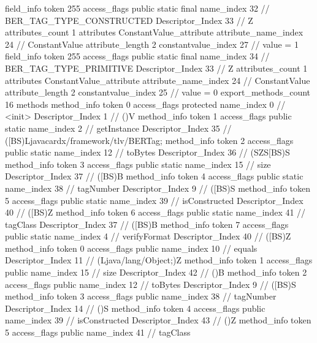 {{{{{{{				}
				}
			}
			field_info {
				token	255
				access_flags	public static final
				name_index	32		// BER_TAG_TYPE_CONSTRUCTED
				Descriptor_Index	33		// Z
				attributes_count	1
				attributes {
				ConstantValue_attribute {
					attribute_name_index	24		// ConstantValue
					attribute_length	2
					constantvalue_index	27		// value = 1
				}
				}
			}
			field_info {
				token	255
				access_flags	public static final
				name_index	34		// BER_TAG_TYPE_PRIMITIVE
				Descriptor_Index	33		// Z
				attributes_count	1
				attributes {
				ConstantValue_attribute {
					attribute_name_index	24		// ConstantValue
					attribute_length	2
					constantvalue_index	25		// value = 0
				}
				}
			}
			}
			export_methods_count	16
			methods {
				method_info {
					token	0
					access_flags	protected
					name_index	0		// <init>
					Descriptor_Index	1		// ()V
				}
				method_info {
					token	1
					access_flags	public static
					name_index	2		// getInstance
					Descriptor_Index	35		// ([BS)Ljavacardx/framework/tlv/BERTag;
				}
				method_info {
					token	2
					access_flags	public static
					name_index	12		// toBytes
					Descriptor_Index	36		// (SZS[BS)S
				}
				method_info {
					token	3
					access_flags	public static
					name_index	15		// size
					Descriptor_Index	37		// ([BS)B
				}
				method_info {
					token	4
					access_flags	public static
					name_index	38		// tagNumber
					Descriptor_Index	9		// ([BS)S
				}
				method_info {
					token	5
					access_flags	public static
					name_index	39		// isConstructed
					Descriptor_Index	40		// ([BS)Z
				}
				method_info {
					token	6
					access_flags	public static
					name_index	41		// tagClass
					Descriptor_Index	37		// ([BS)B
				}
				method_info {
					token	7
					access_flags	public static
					name_index	4		// verifyFormat
					Descriptor_Index	40		// ([BS)Z
				}
				method_info {
					token	0
					access_flags	public
					name_index	10		// equals
					Descriptor_Index	11		// (Ljava/lang/Object;)Z
				}
				method_info {
					token	1
					access_flags	public
					name_index	15		// size
					Descriptor_Index	42		// ()B
				}
				method_info {
					token	2
					access_flags	public
					name_index	12		// toBytes
					Descriptor_Index	9		// ([BS)S
				}
				method_info {
					token	3
					access_flags	public
					name_index	38		// tagNumber
					Descriptor_Index	14		// ()S
				}
				method_info {
					token	4
					access_flags	public
					name_index	39		// isConstructed
					Descriptor_Index	43		// ()Z
				}
				method_info {
					token	5
					access_flags	public
					name_index	41		// tagClass
}}}}}
